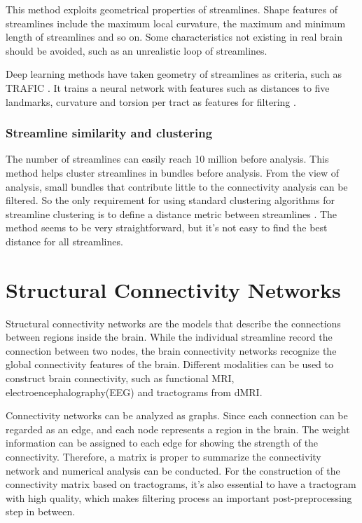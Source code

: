 This method exploits geometrical properties of streamlines.
Shape features of streamlines include the maximum local curvature, the maximum and minimum length of streamlines and so on. 
Some characteristics not existing in real brain should be avoided, such as an unrealistic loop of streamlines. 

Deep learning methods have taken geometry of streamlines as criteria, such as TRAFIC \cite*{lamTRAFICFiberTract2018}. 
It trains a neural network with features such as distances to five landmarks, curvature and torsion per tract as features for filtering \cite*{lamTRAFICFiberTract2018}.

\subsubsection{Streamline similarity and clustering}

The number of streamlines can easily reach 10 million before analysis. 
This method helps cluster streamlines in bundles before analysis. 
From the view of analysis, small bundles that contribute little to the connectivity analysis can be filtered. 
So the only requirement for using standard clustering algorithms for streamline clustering 
is to define a distance metric between streamlines \cite*[]{ozarslanAnisotropyFieldsScales2021}.
The method seems to be very straightforward, but it's not easy to find the best distance for all streamlines.


\section{Structural Connectivity Networks}

Structural connectivity networks are the models that describe the connections between regions inside the brain.
While the individual streamline record the connection between two nodes, the brain connectivity networks recognize
the global connectivity features of the brain. Different modalities can be used to construct brain connectivity, such as functional MRI,
electroencephalography(EEG) and tractograms from dMRI.

Connectivity networks can be analyzed as graphs. Since each connection can be regarded as an edge, and each node
represents a region in the brain. The weight information can be assigned to each edge for showing the strength of the connectivity.
Therefore, a matrix is proper to summarize the connectivity network and numerical analysis can be conducted.
For the construction of the connectivity matrix based on tractograms, it's also essential to have a tractogram with high quality,
which makes filtering process an important post-preprocessing step in between.
